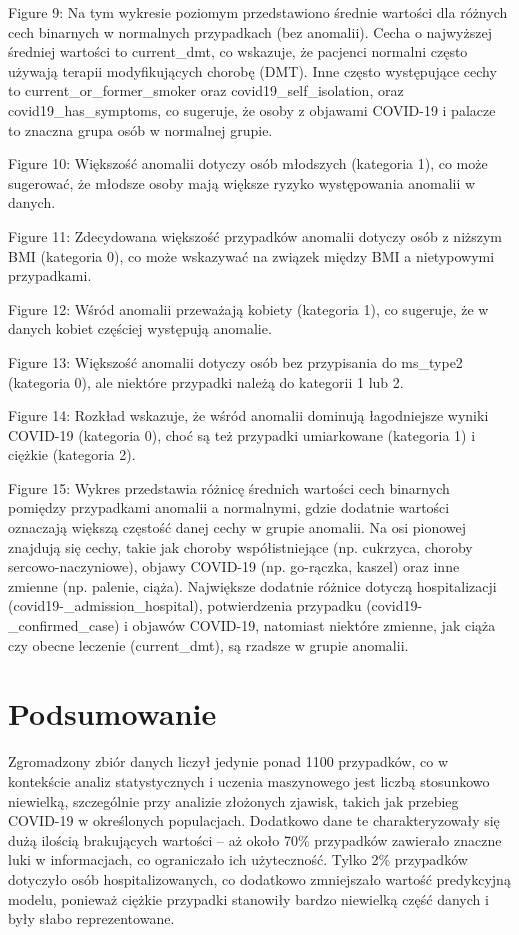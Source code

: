 \documentclass[a4paper,fleqn]{cas-dc}
\begin{document}
Figure 9: Na tym wykresie poziomym przedstawiono średnie wartości dla różnych cech binarnych w normalnych przypadkach (bez anomalii). Cecha o najwyższej średniej wartości to current\_dmt, co wskazuje, że pacjenci normalni często używają terapii modyfikujących chorobę (DMT). Inne często występujące cechy to current\_or\_former\_smoker oraz covid19\_self\_isolation, oraz covid19\_has\_symptoms, co sugeruje, że osoby z objawami COVID-19 i palacze to znaczna grupa osób w normalnej grupie.

Figure 10: Większość anomalii dotyczy osób młodszych (kategoria 1), co może sugerować, że młodsze osoby mają większe ryzyko występowania anomalii w danych.

Figure 11: Zdecydowana większość przypadków anomalii dotyczy osób z niższym BMI (kategoria 0), co może wskazywać na związek między BMI a nietypowymi przypadkami.

Figure 12: Wśród anomalii przeważają kobiety (kategoria 1), co sugeruje, że w danych kobiet częściej występują anomalie.

Figure 13: Większość anomalii dotyczy osób bez przypisania do ms\_type2 (kategoria 0), ale niektóre przypadki należą do kategorii 1 lub 2.

Figure 14: Rozkład wskazuje, że wśród anomalii dominują łagodniejsze wyniki COVID-19 (kategoria 0), choć są też przypadki umiarkowane (kategoria 1) i ciężkie (kategoria 2).

Figure 15: Wykres przedstawia różnicę średnich wartości cech binarnych pomiędzy przypadkami anomalii a normalnymi, gdzie dodatnie wartości oznaczają większą częstość danej cechy w grupie anomalii. Na osi pionowej znajdują się cechy, takie jak choroby współistniejące (np. cukrzyca, choroby sercowo-naczyniowe), objawy COVID-19 (np. go-rączka, kaszel) oraz inne zmienne (np. palenie, ciąża). Największe dodatnie różnice dotyczą hospitalizacji (covid19-\_admission\_hospital), potwierdzenia przypadku (covid19-\_confirmed\_case) i objawów COVID-19, natomiast niektóre zmienne, jak ciąża czy obecne leczenie (current\_dmt), są rzadsze w grupie anomalii.

\section{Podsumowanie}
Zgromadzony zbiór danych liczył jedynie ponad 1100 przypadków, co w kontekście analiz statystycznych i uczenia maszynowego jest liczbą stosunkowo niewielką, szczególnie przy analizie złożonych zjawisk, takich jak przebieg COVID-19 w określonych populacjach. Dodatkowo dane te charakteryzowały się dużą ilością brakujących wartości – aż około 70\% przypadków zawierało znaczne luki w informacjach, co ograniczało ich użyteczność. Tylko 2\% przypadków dotyczyło osób hospitalizowanych, co dodatkowo zmniejszało wartość predykcyjną modelu, ponieważ ciężkie przypadki stanowiły bardzo niewielką część danych i były słabo reprezentowane.
\end{document}

